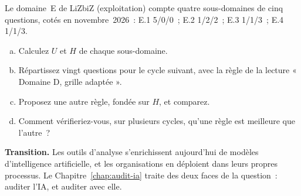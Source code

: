 \begin{boxexo}[title={\ding{45}\quad Exercice~19.3. Une grille adaptative pour le domaine E \niveauexpert}]
Le domaine~E de LiZbiZ (exploitation) compte quatre sous-domaines de cinq
questions, cotés en novembre~2026~: E.1 5/0/0~; E.2 1/2/2~; E.3 1/1/3~;
E.4 1/1/3.
\begin{enumerate}[(a)]
    \item Calculez $U$ et $H$ de chaque sous-domaine.
    \item Répartissez vingt questions pour le cycle suivant, avec la règle
          de la lecture « Domaine D, grille adaptée ».
    \item Proposez une autre règle, fondée sur $H$, et comparez.
    \item Comment vérifieriez-vous, sur plusieurs cycles, qu'une règle est
          meilleure que l'autre~?
\end{enumerate}
\end{boxexo}

\bigskip

\begin{boxinfo}
\textbf{Transition.} Les outils d'analyse s'enrichissent aujourd'hui de
modèles d'intelligence artificielle, et les organisations en déploient
dans leurs propres processus. Le Chapitre~\ref{chap:audit-ia} traite des
deux faces de la question~: auditer l'IA, et auditer avec elle.
\end{boxinfo}
